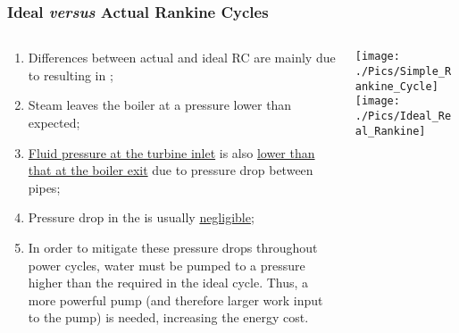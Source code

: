 \documentclass[10pt,compress,handout,unknownkeysallowed]{beamer}
\begin{document}
\begin{frame}
 \frametitle{Ideal {\it versus} Actual Rankine Cycles}
   \begin{columns}
      \begin{column}[c]{0.5\linewidth}
         \begin{enumerate}\scriptsize
             \item<1-> Differences between actual and ideal RC are mainly due to  resulting in ;
             \item<2-> Steam leaves the boiler at a pressure lower than expected; 
             \item<3-> \underline{Fluid pressure at the turbine inlet} is also \underline{lower than that at the boiler exit} due to pressure drop between pipes; 
             \item<4-> Pressure drop in the  is usually \underline{negligible}; 
             \item<5-> In order to mitigate these pressure drops throughout power cycles, water must be pumped to a pressure higher than the required in the ideal cycle. Thus, a more powerful pump (and therefore larger work input to the pump) is needed, increasing the energy cost.  
         \end{enumerate}\scriptsize
      \end{column}
      \begin{column}[c]{0.5\linewidth}
         \vbox{
           \hbox{\hspace{.5cm}\texttt{[image: ./Pics/Simple\_Rankine\_Cycle]}}
           \vspace{-0.1cm}
           \hbox{\hspace{.5cm}\texttt{[image: ./Pics/Ideal\_Real\_Rankine]}}
         }
      \end{column}
   \end{columns}
 \normalsize
\end{frame}
\end{document}
